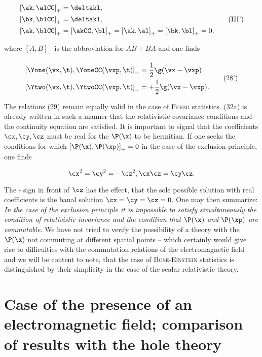 \documentclass{article}
\newcommand{\inv}[1]{\frac{1}{#1}}
\newcommand{\commutator}[2]{\left[ #1, #2 \right]}
\newcommand{\anticommutator}[2]{\left[ #1, #2 \right]_{+}}
\renewcommand{\it}[1]{\textit{#1}}
\renewcommand{\sc}[1]{\textsc{#1}}
\newcommand{\nequ}[2]{
\begin{equation*}
#1
\tag{#2}
\end{equation*}
}
\newcommand{\uequ}[1]{
\begin{equation*}
#1
\end{equation*}
}
\begin{document}
\nequ{
\begin{split}
\anticommutator{\ak}{\alCC} &= \deltakl, \\
\anticommutator{\bk}{\blCC} &= \deltakl, \\
\anticommutator{\ak}{\blCC} &= 
\anticommutator{\akCC}{\bl} = 
\anticommutator{\ak}{\al} = 
\anticommutator{\bk}{\bl} = 0,
\end{split}
}{III'}

where $\anticommutator{A}{B}$ is the abbreviation for $AB + BA$ and one finds

\nequ{
\begin{split}
\anticommutator{\Yone(\vx, \t)}{\YoneCC(\vxp, \t)} &= \inv{2}\g(\vx - \vxp) \\
\anticommutator{\Ytwo(\vx, \t)}{\YtwoCC(\vxp, \t)} &= +\inv{2}\g(\vx - \vxp).
\end{split}
}{28'}

The relations (29) remain equally valid in the case of \sc{Fermi} statistics. (32a) is already written in such a manner that the relativistic covariance conditions and the continuity equation are satisfied. It is important to signal that the coefficients $\cx, \cy, \cz$ must be real for the $\P(\x)$ to be hermitian. If one seeks the conditions for which $\commutator{\P(\x)}{\P(\xp)}_{-} = 0$ in the case of the exclusion principle, one finds

\uequ{
\cx^2 = \cy^2 = -\cz^2, \cx\cz = \cy\cz.
}

The - sign in front of $\cz$ has the effect, that the sole possible solution with real coefficients is the banal solution $\cx = \cy = \cz = 0.$ One may then summarize: \it{In the case of the exclusion principle it is impossible to satisfy simultaneously the condition of relativistic invariance and the condition that $\P(\x)$ and $\P(\xp)$ are commutable}. 
We have not tried to verify the possibility of a theory with the $\P(\x)$ not commuting at different spatial points -- which certainly would give rise to difficulties with the commutation relations of the electromagnetic field -- and we will be content to note, that the case of \sc{Bose-Einstein} statistics is distinguished by their simplicity in the case of the scalar relativistic theory.

\section{Case of the presence of an electromagnetic field; comparison of results with the hole theory}
\end{document}
